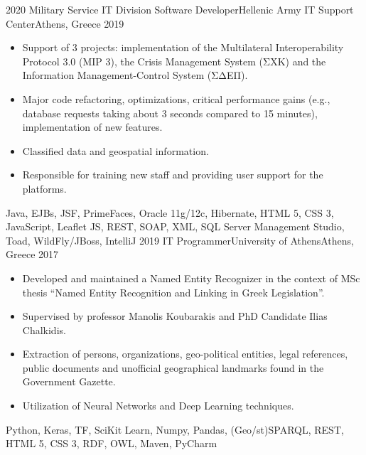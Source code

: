 \begin{experiences}
  \experience
    {2020}   {Military Service IT Division Software Developer}{Hellenic Army IT Support Center}{Athens, Greece}
    {2019} {
                    \begin{itemize}
                      \item Support of 3 projects: implementation of the Multilateral Interoperability Protocol 3.0 (MIP 3), the Crisis Management System (ΣΧΚ) 
                      and the Information Management-Control System (ΣΔΕΠ).

                      \item Major code refactoring, optimizations, critical performance gains (e.g., database requests taking about 3 seconds compared to 15 minutes), 
                      implementation of new features.

                      \item Classified data and geospatial information.

                      \item Responsible for training new staff and providing user support for the platforms.
                    \end{itemize}
                    }
                    {Java, EJBs, JSF, PrimeFaces, Oracle 11g/12c, Hibernate, HTML 5, CSS 3, JavaScript, Leaflet JS, REST, SOAP, XML, SQL Server Management Studio, Toad, WildFly/JBoss, IntelliJ}
  \emptySeparator
  \experience
    {2019} {IT Programmer}{University of Athens}{Athens, Greece}
    {2017}    {
                    \begin{itemize}
                      \item Developed and maintained a Named Entity Recognizer in the context of MSc thesis ``Named Entity Recognition and Linking in Greek Legislation''.

                      \item Supervised by professor Manolis Koubarakis and PhD Candidate Ilias Chalkidis.

                      \item Extraction of persons, organizations, geo-political entities, legal references, public documents and unofficial geographical landmarks found in the Government Gazette.

                      \item Utilization of Neural Networks and Deep Learning techniques.
                    \end{itemize}
                    }
                    {Python, Keras, TF, SciKit Learn, Numpy, Pandas, (Geo/st)SPARQL, REST, HTML 5, CSS 3, RDF, OWL, Maven, PyCharm}
\end{experiences}
